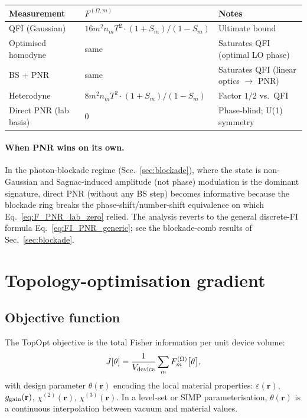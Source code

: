 \documentclass[11pt]{article}
\begin{document}
{\small
\begin{center}
\begin{tabular}{lll}
\toprule
Measurement & $F^{(\Omega,m)}$ & Notes \\
\midrule
QFI (Gaussian) & $16 m^2 n_m T^2\cdot(1+S_m)/(1-S_m)$
  & Ultimate bound~\cite{Pinel2012,Monras2006}\\
Optimised homodyne & same & Saturates QFI (optimal LO phase)\\
BS + PNR & same & Saturates QFI (linear optics $\to$ PNR)\\
Heterodyne & $8 m^2 n_m T^2\cdot(1+S_m)/(1-S_m)$
  & Factor $1/2$ vs.\ QFI \\
Direct PNR (lab basis) & $0$
  & Phase-blind; U(1) symmetry \\
\bottomrule
\end{tabular}
\end{center}}

\paragraph{When PNR wins on its own.}  In the photon-blockade regime
(Sec.~\ref{sec:blockade}), where the state is non-Gaussian and
Sagnac-induced amplitude (not phase) modulation is the dominant
signature, direct PNR (without any BS step) becomes informative
because the blockade ring breaks the phase-shift/number-shift
equivalence on which Eq.~\eqref{eq:F_PNR_lab_zero} relied.  The
analysis reverts to the general discrete-FI formula
Eq.~\eqref{eq:FI_PNR_generic}; see the blockade-comb results of
Sec.~\ref{sec:blockade}.

\section{Topology-optimisation gradient}
\label{sec:topopt}

\subsection{Objective function}

The TopOpt objective is the total Fisher information per unit device
volume:
\begin{equation}
  J[\theta] = \frac{1}{V_{\rm device}}\sum_m F_m^{(\Omega)}\bigl[\theta\bigr],
  \label{eq:objective}
\end{equation}
with design parameter $\theta(\mathbf{r})$ encoding the local material
properties: $\varepsilon(\mathbf{r})$, $g_{\rm gain}(\mathbf{r})$,
$\chi^{(2)}(\mathbf{r})$, $\chi^{(3)}(\mathbf{r})$.  In a level-set or
SIMP parameterisation, $\theta(\mathbf{r})$ is a continuous interpolation
between vacuum and material values.
\end{document}
